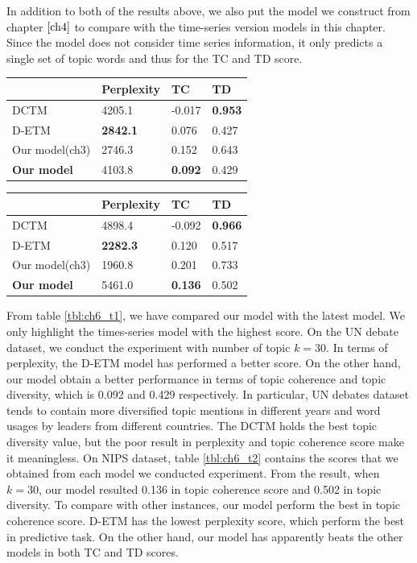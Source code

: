 In addition to both of the results above, we also put the model we construct from chapter $ \ref{ch4} $ to compare with the time-series version models in this chapter. Since the model does not consider time series information, it only predicts a single set of topic words and thus for the TC and TD score.
\begin{table}[h]
\centering
\begin{tabular}{llll}
\hline
     & Perplexity  &TC&TD\\ \hline
DCTM	     	&  4205.1 & -0.017 & \textbf{0.953}\\
D-ETM	     	&  \textbf{2842.1} & 0.076 & 0.427 \\
Our model(ch3) & 2746.3 & 0.152 & 0.643 \\
\textbf{Our model}  & 4103.8 & \textbf{0.092} & 0.429 \\ \hline
\end{tabular}
\end{table}
\begin{table}[h]
\centering
\begin{tabular}{llll}
\hline
     & Perplexity & TC & TD \\\hline
DCTM	     	& 4898.4 & -0.092 & \textbf{0.966} \\
D-ETM	     	& \textbf{2282.3} & 0.120 & 0.517 \\
Our model(ch3) & 1960.8 & 0.201 & 0.733 \\
\textbf{Our model}  & 5461.0 & \textbf{0.136} & 0.502 \\\hline
\end{tabular}
\end{table}

From table \ref{tbl:ch6_t1}, we have compared our model with the latest model. We only highlight the times-series model with the highest score. 
On the UN debate dataset, we conduct the experiment with number of topic $ k=30 $. In terms of perplexity, the D-ETM model has performed a better score. On the other hand, our model obtain a better performance in terms of topic coherence and topic diversity, which is 0.092 and 0.429 respectively. In particular, UN debates dataset tends to contain more diversified topic mentions in different years and word usages by leaders from different countries. 
The DCTM holds the best topic diversity value, but the poor result in perplexity and topic coherence score make it meaningless.
On NIPS dataset, table \ref{tbl:ch6_t2} contains the scores that we obtained from each model we conducted experiment. From the result, when $ k=30 $, our model resulted 0.136 in topic coherence score and 0.502 in topic diversity. To compare with other instances, our model perform the best in topic coherence score. D-ETM has the lowest perplexity score, which perform the best in predictive task. On the other hand, our model has apparently beats the other models in both TC and TD scores. 
